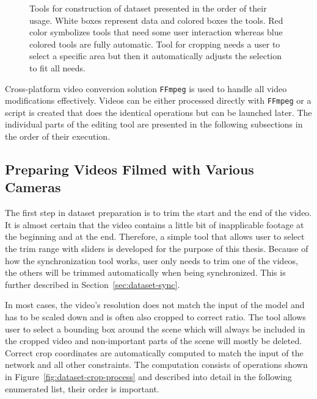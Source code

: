 \begin{figure}[ht!]
    
    \caption{Tools for construction of dataset presented in the order of their usage. White boxes represent data and colored boxes the tools. Red color symbolizes tools that need some user interaction whereas blue colored tools are fully automatic. Tool for cropping needs a user to select a specific area but then it automatically adjusts the selection to fit all needs.}
    \label{fig:dataset-preparation}
\end{figure}

Cross-platform video conversion solution \texttt{FFmpeg} is used to handle all video modifications effectively. Videos can be either processed directly with \texttt{FFmpeg} or a script is created that does the identical operations but can be launched later. The individual parts of the editing tool are presented in the following subsections in the order of their execution.

\subsection{Preparing Videos Filmed with Various Cameras}

The first step in dataset preparation is to trim the start and the end of the video. It is almost certain that the video contains a little bit of inapplicable footage at the beginning and at the end. Therefore, a simple tool that allows user to select the trim range with sliders is developed for the purpose of this thesis. Because of how the synchronization tool works, user only needs to trim one of the videos, the others will be trimmed automatically when being synchronized. This is further described in Section~\ref{sec:dataset-sync}.

In most cases, the video's resolution does not match the input of the model and has to be scaled down and is often also cropped to correct ratio. The tool allows user to select a bounding box around the scene which will always be included in the cropped video and non-important parts of the scene will mostly be deleted. Correct crop coordinates are automatically computed to match the input of the network and all other constraints. The computation consists of operations shown in Figure~\ref{fig:dataset-crop-process} and described into detail in the following enumerated list, their order is important.


